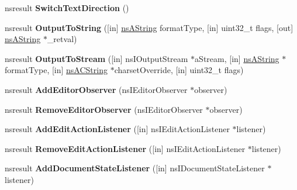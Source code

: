 \begin{DoxyCompactItemize}
\item 
\mbox{\label{interfacens_i_editor_a974df091fa65447499daf1184bfbdb08}} 
nsresult {\bfseries Switch\+Text\+Direction} ()
\item 
\mbox{\label{interfacens_i_editor_ac2cbdb7c2688ebea2533cb01c369a95c}} 
nsresult {\bfseries Output\+To\+String} (\mbox{[}in\mbox{]} \hyperlink{structns_string_container}{ns\+A\+String} format\+Type, \mbox{[}in\mbox{]} uint32\+\_\+t flags, \mbox{[}out\mbox{]} \hyperlink{structns_string_container}{ns\+A\+String} $\ast$\+\_\+retval)
\item 
\mbox{\label{interfacens_i_editor_a1cbf300038c09762acf86f188ddc04f0}} 
nsresult {\bfseries Output\+To\+Stream} (\mbox{[}in\mbox{]} ns\+I\+Output\+Stream $\ast$a\+Stream, \mbox{[}in\mbox{]} \hyperlink{structns_string_container}{ns\+A\+String} $\ast$format\+Type, \mbox{[}in\mbox{]} \hyperlink{structns_c_string_container}{ns\+A\+C\+String} $\ast$charset\+Override, \mbox{[}in\mbox{]} uint32\+\_\+t flags)
\item 
\mbox{\label{interfacens_i_editor_a1db591b2155084a5bd00b56f1740e142}} 
nsresult {\bfseries Add\+Editor\+Observer} (ns\+I\+Editor\+Observer $\ast$observer)
\item 
\mbox{\label{interfacens_i_editor_a074a305d7f63db7c1f9611885965a024}} 
nsresult {\bfseries Remove\+Editor\+Observer} (ns\+I\+Editor\+Observer $\ast$observer)
\item 
\mbox{\label{interfacens_i_editor_abe1f4368986e6782a8ea0badee0c5f23}} 
nsresult {\bfseries Add\+Edit\+Action\+Listener} (\mbox{[}in\mbox{]} ns\+I\+Edit\+Action\+Listener $\ast$listener)
\item 
\mbox{\label{interfacens_i_editor_a43e8aa38ef1ef436f40a77dbdb06eed9}} 
nsresult {\bfseries Remove\+Edit\+Action\+Listener} (\mbox{[}in\mbox{]} ns\+I\+Edit\+Action\+Listener $\ast$listener)
\item 
\mbox{\label{interfacens_i_editor_ac15063b123af040f2abfbac77279b3b5}} 
nsresult {\bfseries Add\+Document\+State\+Listener} (\mbox{[}in\mbox{]} ns\+I\+Document\+State\+Listener $\ast$listener)

\end{DoxyCompactItemize}
